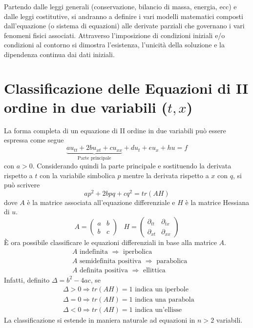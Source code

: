Partendo dalle leggi generali (conservazione, bilancio di massa, energia, ecc) e
dalle leggi costitutive, si andranno a definire
i vari modelli matematici composti dall'equazione (o sistema di equazioni) alle
derivate parziali che governano i vari fenomeni fisici associati.
Attraverso l'imposizione di condizioni iniziali e/o condizioni al contorno si
dimostra l'esistenza, l'unicit\`a della soluzione e la dipendenza continua
dai dati iniziali.
\section{\texorpdfstring
{Classificazione delle Equazioni di II ordine in due variabili ($t,x$)}
{Classificazione delle Equazioni di II ordine in due variabili (t,x)}}
La forma completa di un equazione di II ordine in due variabili pu\`o essere
espressa come segue
\[
	\underbrace{au_{tt}+2bu_{xt}+cu_{xx}}_\text{Parte principale} +
	du_t + eu_x + hu = f
\]
con $a>0$.
Considerando quindi la parte principale e sostituendo la derivata rispetto a $t$
con la variabile simbolica $p$ mentre la derivata
rispetto a $x$ con $q$, si pu\`o scrivere
\[
	ap^2 + 2bpq + cq^2 = tr(AH)
\]
dove $A$ \`e la matrice associata all'equazione differenziale e $H$ \`e la
matrice Hessiana di $u$.
\[
A=
 \begin{pmatrix}
  a & b \\
  b & c
 \end{pmatrix}
\;\;\;
H=
 \begin{pmatrix}
  \partial_{tt} & \partial_{tx} \\
  \partial_{xt} & \partial_{xx}
 \end{pmatrix}
\]
\`E ora possibile classificare le equazioni differenziali in base alla matrice
$A$.
%
\begin{align*}
& A \mbox{ indefinita }  \Rightarrow  \mbox{ iperbolica}\\
& A \mbox{ semidefinita positiva }  \Rightarrow  \mbox{ parabolica}\\
& A \mbox{ definita positiva }  \Rightarrow  \mbox{ ellittica}
\end{align*}
%
Infatti, definito $\Delta=b^2-4ac$, se
%
\begin{align*}
& \Delta>0 \Rightarrow tr(AH)=1 \mbox{ indica un iperbole }\\
& \Delta=0 \Rightarrow tr(AH)=1 \mbox{ indica una parabola }\\
& \Delta<0 \Rightarrow tr(AH)=1 \mbox{ indica un'ellisse }
\end{align*}
%
La classificazione si estende in maniera naturale ad equazioni in $n>2$
variabili.

